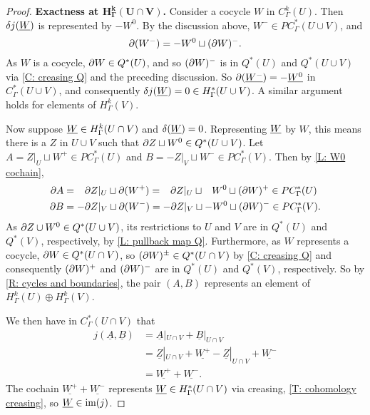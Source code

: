 \begin{proof}
	\textbf{Exactness at $\mathbf{H^k_\Gamma(U \cap V)}$.}
	Consider a cocycle $W$ in $C^k_\Gamma(U)$.
	Then $\delta j(\underline{W})$ is represented by $-W^0$.
	By the discussion above, $W^- \in PC^*_\Gamma(U \cup V)$, and $$\partial (W^-) = -W^0 \sqcup (\partial W)^-.$$ As $W$ is a cocycle, $\partial W \in Q^*(U)$, and so $(\partial W)^-$ is in $Q^*(U)$ and $Q^*(U \cup V)$ via \cref{C: creasing Q} and the preceding discussion.
	So $\partial (\underline{W^-}) = - \underline{W^0}$ in $C^*_\Gamma(U \cup V)$, and consequently
    $\delta j(\underline{W}) = 0 \in H^*_\Gamma(U \cup V)$.
	A similar argument holds for elements of $H^k_\Gamma(V)$.

	Now suppose $\underline{W} \in H^k_\Gamma(U \cap V)$ and $\delta(\underline{W}) = 0$.
	Representing $\underline{W}$ by $W$, this means there is a $Z$ in $U \cup V$ such that $\partial Z \sqcup W^0 \in Q^*(U \cup V)$.
	Let $A = Z|_U \sqcup W^+ \in PC^*_\Gamma(U)$ and $B = -Z|_V \sqcup W^- \in PC^*_\Gamma(V)$.
	Then by \cref{L: W0 cochain},
	\begin{align*}
		\partial A& = \phantom{-}\partial Z|_U \sqcup \partial( W^+) = \phantom{-}\partial Z|_U \sqcup \phantom{-} W^0 \sqcup (\partial W)^{+} \in PC^*_\Gamma(U)\\
		\partial B& = -\partial Z|_V \sqcup \partial (W^-) = -\partial Z|_V \sqcup -W^0 \sqcup (\partial W)^{-}  \in PC^*_\Gamma(V).
	\end{align*}
	As $\partial Z \cup W^0 \in Q^*(U \cup V)$, its restrictions to $U$ and $V$ are in $Q^*(U)$ and $Q^*(V)$, respectively, by \cref{L: pullback map Q}.
	Furthermore, as $W$ represents a cocycle, $\partial W \in Q^*(U \cap V)$, so $(\partial W)^\pm \in Q^*(U\cap V)$ by \cref{C: creasing Q} and consequently $(\partial W)^+$ and $(\partial W)^-$ are in $Q^*(U)$ and $Q^*(V)$, respectively.
	So by \cref{R: cycles and boundaries}, the pair $(A,B)$ represents an element of $H^k_\Gamma(U) \oplus H^k_\Gamma(V)$.

	We then have in $C^*_\Gamma(U \cap V)$ that
	\begin{align*}
		j(\underline{A}, \underline{B})& = \underline{A}|_{U \cap V} + \underline{B}|_{U \cap V}\\
		& = \underline{Z}|_{U \cap V}+ \underline{W^+} - \underline{Z}|_{U \cap V} + \underline{W^-}\\
		& = \underline{W^+} + \underline{W^-}.
	\end{align*}
	The cochain $\underline{W^+} + \underline{W^-}$ represents $\underline{W} \in H^*_\Gamma(U \cap V)$ via creasing, \cref{T: cohomology creasing}, so $\underline{W} \in \text{im}(j)$.
\end{proof}

